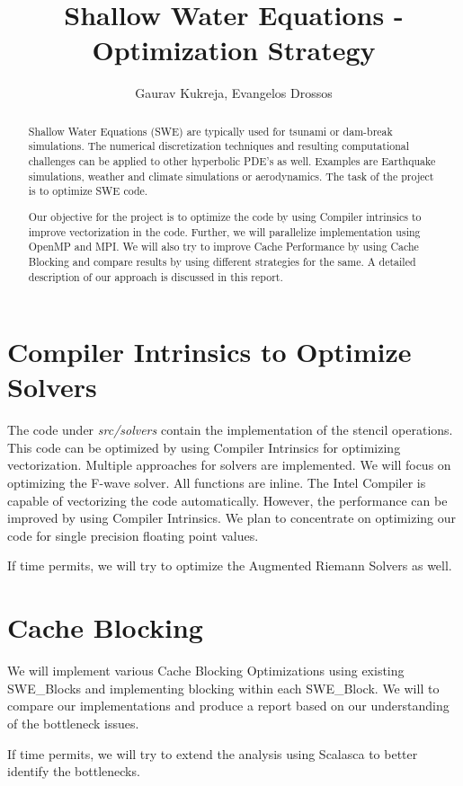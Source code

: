 \documentclass[]{article}
\title{Shallow Water Equations - Optimization Strategy}
\author{Gaurav Kukreja, Evangelos Drossos}
\begin{document}
\maketitle

\begin{abstract}
Shallow Water Equations (SWE) are typically used for tsunami or dam-break simulations.
The numerical discretization techniques and resulting computational challenges can be
applied to other hyperbolic PDE's as well. Examples are Earthquake simulations,
weather and climate simulations or aerodynamics. The task of the project is to optimize
SWE code. 

Our objective for the project is to optimize the code by using Compiler intrinsics to
improve vectorization in the code. Further, we will parallelize implementation using
OpenMP and MPI. We will also try to improve Cache Performance by using Cache Blocking
and compare results by using different strategies for the same. A detailed description of
our approach is discussed in this report.
\end{abstract}

\section{Compiler Intrinsics to Optimize Solvers}
The code under \textit{src/solvers} contain the implementation of the stencil operations.
This code can be optimized by using Compiler Intrinsics for optimizing vectorization.
Multiple approaches for solvers are implemented. We will focus on optimizing the 
F-wave solver. All functions are inline. The Intel Compiler is capable of vectorizing
the code automatically. However, the performance can be improved by using Compiler
Intrinsics. We plan to concentrate on optimizing our code for single precision floating point values.

If time permits, we will try to optimize the Augmented Riemann Solvers as well.

\section{Cache Blocking}
We will implement various Cache Blocking Optimizations using existing SWE\_Blocks and
implementing blocking within each SWE\_Block. We will to compare our implementations and
produce a report based on our understanding of the bottleneck issues.

If time permits, we will try to extend the analysis using Scalasca to better identify
the bottlenecks.
\end{document}
